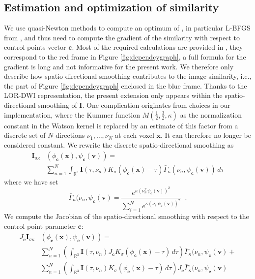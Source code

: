 \documentclass[twocolumn]{svjour3}
\begin{document}
\subsection{Estimation and optimization of similarity} 
We use quasi-Newton methods to compute an optimum of , in particular
L-BFGS\cite{} from \cite{schmidt2005minfunc}, and thus need to compute the gradient of the
similarity with respect to control points vector $\bm c$. Most of the required
calculations are provided in
\cite{rueckert1999nonrigid,darknersporring2012pami,jensen2015locally}, they correspond to
the red frame in Figure \ref{fig:dependcygraph}, a full formula for the gradient is long
and not informative for the present work. We therefore only describe how
spatio-directional smoothing contributes to the image similarity, i.e., the part of Figure
\ref{fig:dependcygraph} enclosed in the blue frame. Thanks to the LOR-DWI representation,
the present extension only appears within the spatio-directional smoothing of $\bm I$.
One complication originates from choices in our implementation, where the Kummer function
$M(\frac12, \frac32, \kappa)$ as the normalization constant in the Watson kernel is
replaced by an estimate of this factor from a discrete set of $N$ directions
$\nu_1,\dots,\nu_N$ at each voxel $\bm x$. It can therefore no longer be considered
constant. We rewrite the discrete spatio-directional smoothing as
\begin{align}
    {\bm I}_{\sigma \kappa}&(\phi_{\bm c}(\bm x), \psi_{\bm c}(\bm v)) =\nonumber\\
    &\sum_{n=1}^N \int_{\mathbb R^3}\bm I(\tau, \nu_n)K_\sigma(\phi_{\bm c}(\bm x)-\tau)
    \bar{\Gamma}_{\kappa}(\nu_n, \psi_{\bm c}(\bm v))\,d\tau
\end{align}
where we have set
\begin{equation}
 \label{eq:discreteWatson}
 \bar{\Gamma}_{\kappa}(\nu_n,\psi_{\bm c}(\bm v) =  \frac{e^{\kappa(\nu_n^\top\psi_{\bm c}(\bm v))^2}}
 {\sum_{i=1}^Ne^{\kappa(\nu_i^\top\psi_{\bm c}(\bm v))^2}} \;\; .
\end{equation}
We compute the Jacobian of the spatio-directional smoothing with respect to the control
point parameter $\bm c$:
\begin{align}
    J_{\bm c}{\bm I}_{\sigma \kappa}&(\phi_{\bm c}(\bm x), \psi_{\bm c}(\bm v)) =\nonumber\\
    &\sum_{n=1}^N\left(\int_{\mathbb R^3} \bm I(\tau, \nu_n)J_{\bm c}K_{\sigma}
    (\phi_{\bm c}(\bm x)-\tau)\,d\tau\right)\bar{\Gamma}_{\kappa}(\nu_n,\psi_{\bm c}(\bm v)  + \nonumber\\
    &\sum_{n=1}^N\left(\int_{\mathbb R^3} \bm I(\tau, \nu_n)K_{\sigma}
    (\phi_{\bm c}(\bm x)-\tau)\,d\tau\right)J_{\bm c}\bar{\Gamma}_{\kappa}(\nu_n,\psi_{\bm c}(\bm v) 
    \label{eq:sddirs}
\end{align}
\end{document}
